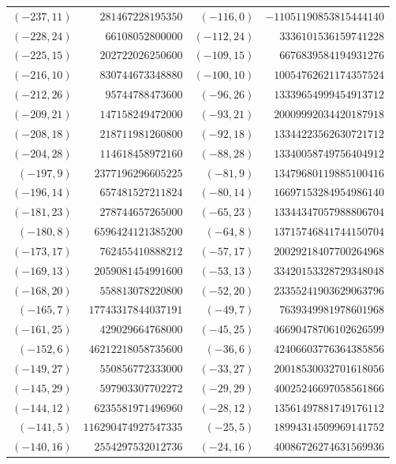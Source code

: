 {\scriptsize\begin{tabular}{@{}r@{\ \ }r@{\qquad}r@{\ \ }r@{}}
$(-237,11)$ & $281467228195350$ & $(-116,0)$ & $-11051190853815444140$ \\
$(-228,24)$ & $66108052800000$ & $(-112,24)$ & $3336101536159741228$ \\
$(-225,15)$ & $202722026250600$ & $(-109,15)$ & $6676839584194931276$ \\
$(-216,10)$ & $830744673348880$ & $(-100,10)$ & $10054762621174357524$ \\
$(-212,26)$ & $95744788473600$ & $(-96,26)$ & $13339654999454913712$ \\
$(-209,21)$ & $147158249472000$ & $(-93,21)$ & $20009992034420187918$ \\
$(-208,18)$ & $218711981260800$ & $(-92,18)$ & $13344223562630721712$ \\
$(-204,28)$ & $114618458972160$ & $(-88,28)$ & $13340058749756404912$ \\
$(-197,9)$ & $2377196296605225$ & $(-81,9)$ & $13479680119885100416$ \\
$(-196,14)$ & $657481527211824$ & $(-80,14)$ & $16697153284954986140$ \\
$(-181,23)$ & $278744657265000$ & $(-65,23)$ & $13344347057988806704$ \\
$(-180,8)$ & $6596424121385200$ & $(-64,8)$ & $13715746841744150704$ \\
$(-173,17)$ & $762455410888212$ & $(-57,17)$ & $20029218407700264968$ \\
$(-169,13)$ & $2059081454991600$ & $(-53,13)$ & $33420153328729348048$ \\
$(-168,20)$ & $558813078220800$ & $(-52,20)$ & $23355241903629063796$ \\
$(-165,7)$ & $17743317844037191$ & $(-49,7)$ & $7639349981978601968$ \\
$(-161,25)$ & $429029664768000$ & $(-45,25)$ & $46690478706102626599$ \\
$(-152,6)$ & $46212218058735600$ & $(-36,6)$ & $42406603776364385856$ \\
$(-149,27)$ & $550856772333000$ & $(-33,27)$ & $20018530032701618056$ \\
$(-145,29)$ & $597903307702272$ & $(-29,29)$ & $40025246697058561866$ \\
$(-144,12)$ & $6235581971496960$ & $(-28,12)$ & $13561497881749176112$ \\
$(-141,5)$ & $116290474927547335$ & $(-25,5)$ & $18994314509969141752$ \\
$(-140,16)$ & $2554297532012736$ & $(-24,16)$ & $40086726274631569936$ \\

\end{tabular}}
